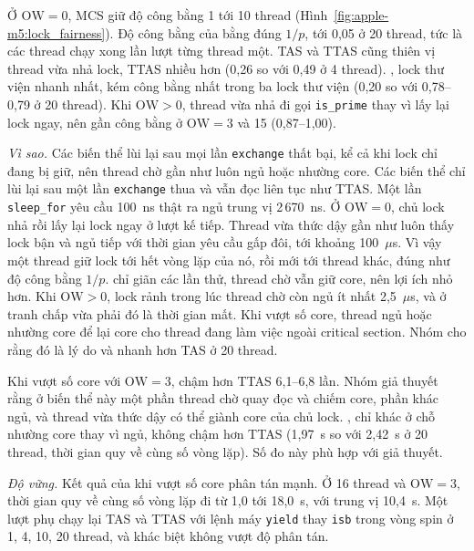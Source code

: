 Ở $\mathrm{OW} = 0$, MCS giữ độ công bằng 1 tới 10 thread (Hình~\ref{fig:apple-m5:lock_fairness}). Độ
công bằng của  bằng đúng $1/p$, tới 0,05 ở 20 thread, tức là các thread chạy xong
lần lượt từng thread một. TAS và TTAS cũng thiên vị thread vừa nhả lock, TTAS nhiều hơn (0,26 so với
0,49 ở 4 thread). , lock thư viện nhanh nhất, kém công bằng nhất trong ba lock thư
viện (0,20 so với 0,78--0,79 ở 20 thread). Khi $\mathrm{OW} > 0$, thread vừa nhả đi gọi
\texttt{is\_prime} thay vì lấy lại lock ngay, nên  gần công bằng ở
$\mathrm{OW} = 3$ và 15 (0,87--1,00).

\emph{Vì sao.} Các biến thể  lùi lại sau mọi lần \texttt{exchange} thất bại, kể cả khi
lock chỉ đang bị giữ, nên thread chờ gần như luôn ngủ hoặc nhường core. Các biến thể 
chỉ lùi lại sau một lần \texttt{exchange} thua và vẫn đọc liên tục như TTAS. Một lần \texttt{sleep\_for}
yêu cầu 100~ns thật ra ngủ trung vị 2\,670~ns. Ở $\mathrm{OW} = 0$, chủ lock nhả rồi lấy lại lock ngay ở
lượt kế tiếp. Thread vừa thức dậy gần như luôn thấy lock bận và ngủ tiếp với thời gian yêu cầu gấp đôi,
tới khoảng 100~$\mu$s. Vì vậy một thread giữ lock tới hết vòng lặp của nó, rồi mới tới thread khác, đúng
như độ công bằng $1/p$.  chỉ giãn các lần thử, thread chờ vẫn giữ core, nên lợi ích
nhỏ hơn. Khi $\mathrm{OW} > 0$, lock rảnh trong lúc thread chờ còn ngủ ít nhất 2,5~$\mu$s, và ở tranh
chấp vừa phải đó là thời gian mất. Khi vượt số core, thread ngủ hoặc nhường core để lại core cho thread
đang làm việc ngoài critical section. Nhóm cho rằng đó là lý do  và
 nhanh hơn TAS ở 20 thread.

Khi vượt số core với $\mathrm{OW} = 3$,  chậm hơn TTAS 6,1--6,8 lần. Nhóm giả
thuyết rằng ở biến thể này một phần thread chờ quay đọc và chiếm core, phần khác ngủ, và thread vừa thức
dậy có thể giành core của chủ lock. , chỉ khác ở chỗ nhường core thay vì ngủ, không
chậm hơn TTAS (1,97~s so với 2,42~s ở 20 thread, thời gian quy về cùng số vòng lặp). Số đo này phù hợp
với giả thuyết.

\emph{Độ vững.} Kết quả của  khi vượt số core phân tán mạnh. Ở 16 thread và
$\mathrm{OW} = 3$, thời gian quy về cùng số vòng lặp đi từ 1,0 tới 18,0~s, với trung vị 10,4~s. Một lượt phụ chạy lại TAS và
TTAS với lệnh máy \texttt{yield} thay \texttt{isb} trong vòng spin ở 1, 4, 10, 20 thread, và khác biệt không vượt độ phân
tán.
